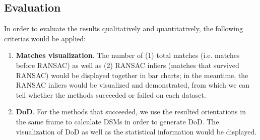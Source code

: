 \subsection{Evaluation}
In order to evaluate the results qualitatively and quantitatively, the following criterias would be applied:\\
\begin{enumerate}
    \item \textbf{Matches visualization}. The number of (1) total matches (i.e. matches before RANSAC) as well as (2) RANSAC inliers (matches that survived RANSAC) would be displayed together in bar charts; in the meantime, the RANSAC inliers would be visualized and demonstrated, from which we can tell whether the methods succeeded or failed on each dataset.
    \item \textbf{DoD}. For the methods that succeeded, we use the resulted orientations in the same frame to calculate DSMs in order to generate DoD. The visualization of DoD as well as the statistical information would be displayed.
\end{enumerate}

